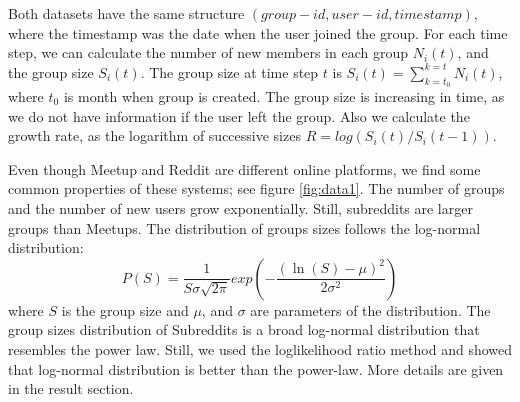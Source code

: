Both datasets have the same structure $(group-id, user-id, timestamp)$, where the timestamp was the date when the user joined the group. For each time step, we can calculate the number of new members in each group $N_i(t)$, and the group size $S_{i}(t)$. The group size at time step $t$ is $S_{i}(t)=\sum^{k=t}_{k=t_{0}}N_{i}(t)$, where $t_0$ is month when group is created. The group size is increasing in time, as we do not have information if the user left the group. Also we calculate the growth rate, as the logarithm of successive sizes $R = log(S_{i}(t)/S_{i}(t-1))$. 

Even though Meetup and Reddit are different online platforms, we find some common properties of these systems; see figure \ref{fig:data1}. The number of groups and the number of new users grow exponentially. Still, subreddits are larger groups than Meetups. The distribution of groups sizes follows the log-normal distribution:
\begin{equation}
P(S)=\frac{1}{S\sigma\sqrt{2\pi}}exp(-\frac{(\ln(S)-\mu)^{2}}{2\sigma^{2}})
\label{eq:log}
\end{equation}
where $S$ is the group size and $\mu$, and $\sigma$ are parameters of the distribution.
The group sizes distribution of Subreddits is a broad log-normal distribution that resembles the power law. Still, we used the loglikelihood ratio method and showed that log-normal distribution is better than the power-law. More details are given in the result section. 



